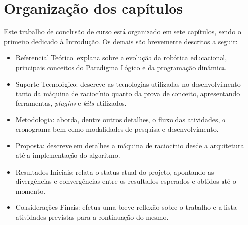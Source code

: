 \section{Organização dos capítulos}
Este trabalho de conclusão de curso está organizado em sete capítulos, sendo o primeiro dedicado à Introdução. Os demais são brevemente descritos a seguir:
\begin{itemize}
\item Referencial Teórico: explana sobre a evolução da robótica educacional, principais conceitos do Paradigma Lógico e da programação dinâmica. 
\item Suporte Tecnológico: descreve as tecnologias utilizadas no desenvolvimento
tanto da máquina de raciocínio quanto da prova de conceito, apresentando ferramentas, \textit{plugins} e \textit{kits} utilizados.
\item Metodologia: aborda, dentre outros detalhes, o fluxo das atividades, o cronograma bem como modalidades de pesquisa e desenvolvimento.
\item Proposta: descreve em detalhes a máquina de raciocínio desde a arquitetura até a implementação do algoritmo.
\item Resultados Iniciais: relata o status atual do projeto, apontando as divergências e convergências entre os resultados esperados e obtidos até o momento.
\item Considerações Finais: efetua uma breve reflexão sobre o trabalho e a lista atividades previstas para a continuação do mesmo.

\end{itemize}


